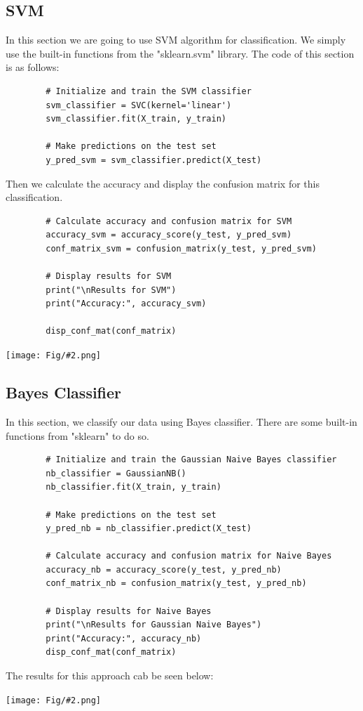 \documentclass[]{article}
\newcommand{\pict}[2]{\begin{center}
		\texttt{[image: Fig/\#2.png]}
\end{center}}
\begin{document}
	\subsection{SVM}
	In this section we are going to use SVM algorithm for classification. We simply use the built-in functions from the "sklearn.svm" library. The code of this section  is as follows:
	\begin{lstlisting}
		# Initialize and train the SVM classifier
		svm_classifier = SVC(kernel='linear')
		svm_classifier.fit(X_train, y_train)
		
		# Make predictions on the test set
		y_pred_svm = svm_classifier.predict(X_test)
	\end{lstlisting}
	Then we calculate the accuracy and display the confusion matrix for this classification.
	\begin{lstlisting}
		# Calculate accuracy and confusion matrix for SVM
		accuracy_svm = accuracy_score(y_test, y_pred_svm)
		conf_matrix_svm = confusion_matrix(y_test, y_pred_svm)
		
		# Display results for SVM
		print("\nResults for SVM")
		print("Accuracy:", accuracy_svm)
		
		disp_conf_mat(conf_matrix)
	\end{lstlisting}
	\pict{0.4}{F5}
	
	\subsection{Bayes Classifier}
	In this section, we classify our data using Bayes classifier. There are some built-in functions from "sklearn" to do so.
	\begin{lstlisting}
		# Initialize and train the Gaussian Naive Bayes classifier
		nb_classifier = GaussianNB()
		nb_classifier.fit(X_train, y_train)
		
		# Make predictions on the test set
		y_pred_nb = nb_classifier.predict(X_test)
		
		# Calculate accuracy and confusion matrix for Naive Bayes
		accuracy_nb = accuracy_score(y_test, y_pred_nb)
		conf_matrix_nb = confusion_matrix(y_test, y_pred_nb)
		
		# Display results for Naive Bayes
		print("\nResults for Gaussian Naive Bayes")
		print("Accuracy:", accuracy_nb)
		disp_conf_mat(conf_matrix)
	\end{lstlisting}
	The results for this approach cab be seen below:
	\pict{0.4}{F6}
	
\end{document}
